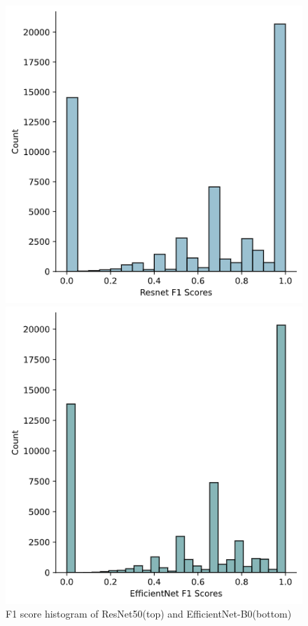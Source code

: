 \documentclass[10pt,twocolumn,letterpaper]{article}
\begin{document}
\begin{figure}
    \centering
    \begin{minipage}[t]{0.4\textwidth}
        \includegraphics[width=\textwidth]{COMP4471_Final_Report/img/resent_f1_dist.png}
    \end{minipage}
    \begin{minipage}[t]{0.4\textwidth}
        \includegraphics[width=\textwidth]{COMP4471_Final_Report/img/efficientnet_f1_dist.png}
    \end{minipage}
    \caption{F1 score histogram of ResNet50(top) and EfficientNet-B0(bottom)}
    \label{fig:f1_dist}
\end{figure}
\end{document}

